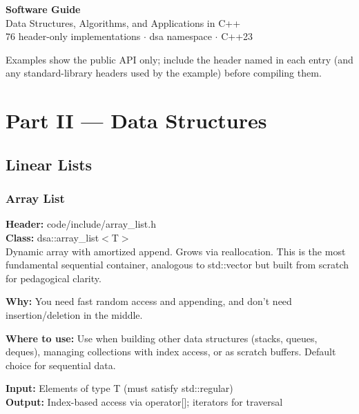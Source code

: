 \documentclass[11pt]{article}
\begin{document}
\begin{center}
{\LARGE\bfseries Software Guide}\\[6pt]
{\large Data Structures, Algorithms, and Applications in C++}\\[4pt]
{\small 76 header-only implementations $\cdot$ dsa namespace $\cdot$ C++23}
\end{center}

\vspace{6pt}
\noindent\hrulefill
\vspace{6pt}

Examples show the public API only; include the header named in each entry (and any standard-library headers used by the example) before compiling them.


\section{Part II --- Data Structures}

\subsection{Linear Lists}

\subsubsection{Array List}
\textbf{Header:} code/include/array\_list.h\\
\textbf{Class:} dsa::array\_list$<$T$>$\\

Dynamic array with amortized append. Grows via reallocation. This is the most fundamental sequential container, analogous to std::vector but built from scratch for pedagogical clarity.

\textbf{Why:} You need fast random access and appending, and don't need insertion/deletion in the middle. \par \textbf{Where to use:} Use when building other data structures (stacks, queues, deques), managing collections with index access, or as scratch buffers. Default choice for sequential data.

\textbf{Input:} Elements of type T (must satisfy std::regular)\\
\textbf{Output:} Index-based access via operator[]; iterators for traversal
\end{document}
